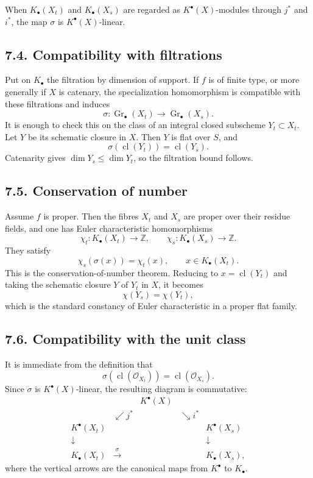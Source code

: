 \documentclass[12pt]{article}
\newcommand{\ZZ}{\mathbb Z}
\newcommand{\cO}{\mathcal O}
\newcommand{\Gr}{\operatorname{Gr}}
\newcommand{\cl}{\operatorname{cl}}
\newcommand{\xto}[1]{\xrightarrow{#1}}
\newcommand{\longto}{\longrightarrow}
\begin{document}
When $K_\bullet(X_t)$ and $K_\bullet(X_s)$ are regarded as $K^\bullet(X)$-modules through $j^*$ and $i^*$, the map $\sigma$ is $K^\bullet(X)$-linear.

\subsection*{7.4. Compatibility with filtrations}

Put on $K_\bullet$ the filtration by dimension of support. If $f$ is of finite type, or more generally if $X$ is catenary, the specialization homomorphism is compatible with these filtrations and induces
\[
\sigma:\Gr_\bullet(X_t)\longto\Gr_\bullet(X_s).
\]
It is enough to check this on the class of an integral closed subscheme $Y_t\subset X_t$. Let $Y$ be its schematic closure in $X$. Then $Y$ is flat over $S$, and
\[
\sigma(\cl(Y_t))=\cl(Y_s).
\]
Catenarity gives $\dim Y_s\leq\dim Y_t$, so the filtration bound follows.

\subsection*{7.5. Conservation of number}

Assume $f$ is proper. Then the fibres $X_t$ and $X_s$ are proper over their residue fields, and one has Euler characteristic homomorphisms
\[
\chi_t:K_\bullet(X_t)\longto\ZZ,
\qquad
\chi_s:K_\bullet(X_s)\longto\ZZ.
\]
They satisfy
\[
\chi_s(\sigma(x))=\chi_t(x),\qquad x\in K_\bullet(X_t).
\]
This is the conservation-of-number theorem. Reducing to $x=\cl(Y_t)$ and taking the schematic closure $Y$ of $Y_t$ in $X$, it becomes
\[
\chi(Y_s)=\chi(Y_t),
\]
which is the standard constancy of Euler characteristic in a proper flat family.



\subsection*{7.6. Compatibility with the unit class}

It is immediate from the definition that
\[
\sigma(\cl(\cO_{X_t}))=\cl(\cO_{X_s}).
\]
Since $\sigma$ is $K^\bullet(X)$-linear, the resulting diagram is commutative:
\[
\begin{array}{ccccc}
&&K^\bullet(X)&&\\
&\swarrow\scriptstyle j^*&&\searrow\scriptstyle i^* &\\
K^\bullet(X_t)&&&&K^\bullet(X_s)\\
\downarrow&&&&\downarrow\\
K_\bullet(X_t)&\xto{\,\sigma\,}&&&K_\bullet(X_s),
\end{array}
\]
where the vertical arrows are the canonical maps from $K^\bullet$ to $K_\bullet$.
\end{document}
